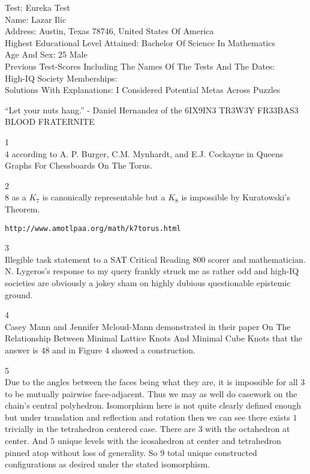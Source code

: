Test: Eureka Test \\
Name: Lazar Ilic \\
Address: Austin, Texas 78746, United States Of America \\
Highest Educational Level Attained: Bachelor Of Science In Mathematics \\
Age And Sex: 25 Male \\
Previous Test-Scores Including The Names Of The Tests And The Dates: \\
High-IQ Society Memberships: \\
Solutions With Explanations: I Considered Potential Metas Across Puzzles

``Let your nuts hang.'' - Daniel Hernandez of the 6IX9IN3 TR3W3Y FR33BAS3 BLOOD FRATERNITE

1 \\
$\boxed{4}$ according to A. P. Burger, C.M. Mynhardt, and E.J. Cockayne in Queens Graphs For Chessboards On The Torus.

2 \\
$\boxed{8}$ as a $K_7$ is canonically representable but a $K_8$ is impossible by Kuratowski's Theorem.

\begin{verbatim}
http://www.amotlpaa.org/math/k7torus.html
\end{verbatim}

3 \\
Illegible task statement to a SAT Critical Reading $800$ scorer and mathematician. N. Lygeros's response to my query frankly struck me as rather odd and high-IQ societies are obviously a jokey sham on highly dubious questionable epistemic ground.

4 \\
Casey Mann and Jennifer Mcloud-Mann demonstrated in their paper On The Relationship Between Minimal Lattice Knots And Minimal Cube Knots that the answer is $\boxed{48}$ and in Figure $4$ showed a construction.

5 \\
Due to the angles between the faces being what they are, it is impossible for all $3$ to be mutually pairwise face-adjacent. Thus we may as well do casework on the chain's central polyhedron. Isomorphism here is not quite clearly defined enough but under translation and reflection and rotation then we can see there exists $1$ trivially in the tetrahedron centered case. There are $3$ with the octahedron at center. And $5$ unique levels with the icosahedron at center and tetrahedron pinned atop without loss of generality. So $\boxed{9}$ total unique constructed configurations as desired under the stated isomorphism.

